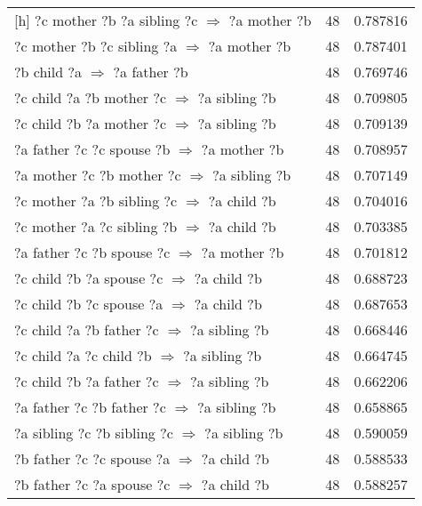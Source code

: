 \begin{longtable}{lrr}[h]
     ?c  mother  ?b  ?a  sibling  ?c   $\Rightarrow$ ?a  mother  ?b &           48 &        0.787816 \\
     ?c  mother  ?b  ?c  sibling  ?a   $\Rightarrow$ ?a  mother  ?b &           48 &        0.787401 \\
                       ?b  child  ?a   $\Rightarrow$ ?a  father  ?b &           48 &        0.769746 \\
      ?c  child  ?a  ?b  mother  ?c   $\Rightarrow$ ?a  sibling  ?b &           48 &        0.709805 \\
      ?c  child  ?b  ?a  mother  ?c   $\Rightarrow$ ?a  sibling  ?b &           48 &        0.709139 \\
      ?a  father  ?c  ?c  spouse  ?b   $\Rightarrow$ ?a  mother  ?b &           48 &        0.708957 \\
     ?a  mother  ?c  ?b  mother  ?c   $\Rightarrow$ ?a  sibling  ?b &           48 &        0.707149 \\
      ?c  mother  ?a  ?b  sibling  ?c   $\Rightarrow$ ?a  child  ?b &           48 &        0.704016 \\
      ?c  mother  ?a  ?c  sibling  ?b   $\Rightarrow$ ?a  child  ?b &           48 &        0.703385 \\
      ?a  father  ?c  ?b  spouse  ?c   $\Rightarrow$ ?a  mother  ?b &           48 &        0.701812 \\
        ?c  child  ?b  ?a  spouse  ?c   $\Rightarrow$ ?a  child  ?b &           48 &        0.688723 \\
        ?c  child  ?b  ?c  spouse  ?a   $\Rightarrow$ ?a  child  ?b &           48 &        0.687653 \\
      ?c  child  ?a  ?b  father  ?c   $\Rightarrow$ ?a  sibling  ?b &           48 &        0.668446 \\
       ?c  child  ?a  ?c  child  ?b   $\Rightarrow$ ?a  sibling  ?b &           48 &        0.664745 \\
      ?c  child  ?b  ?a  father  ?c   $\Rightarrow$ ?a  sibling  ?b &           48 &        0.662206 \\
     ?a  father  ?c  ?b  father  ?c   $\Rightarrow$ ?a  sibling  ?b &           48 &        0.658865 \\
   ?a  sibling  ?c  ?b  sibling  ?c   $\Rightarrow$ ?a  sibling  ?b &           48 &        0.590059 \\
       ?b  father  ?c  ?c  spouse  ?a   $\Rightarrow$ ?a  child  ?b &           48 &        0.588533 \\
       ?b  father  ?c  ?a  spouse  ?c   $\Rightarrow$ ?a  child  ?b &           48 &        0.588257 \\

\end{longtable}
